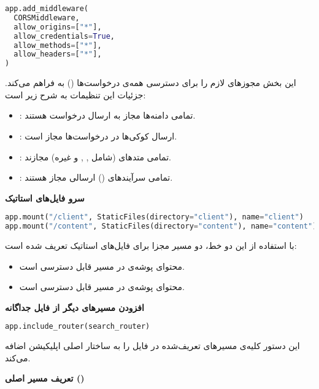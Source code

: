 \documentclass{article}
\begin{document}
\begin{latin}
\begin{lstlisting}[language=Python]
app.add_middleware(
  CORSMiddleware,
  allow_origins=["*"],
  allow_credentials=True,
  allow_methods=["*"],
  allow_headers=["*"],
)
\end{lstlisting}
\end{latin}
این بخش مجوزهای لازم را برای دسترسی همه‌ی درخواست‌ها () به  فراهم می‌کند. جزئیات این تنظیمات به شرح زیر است:
\begin{itemize}
    \item {}: تمامی دامنه‌ها مجاز به ارسال درخواست هستند.
    \item {}: ارسال کوکی‌ها در درخواست‌ها مجاز است.
    \item {}: تمامی متدهای  (شامل , , و غیره) مجازند.
    \item {}: تمامی سرآیندهای () ارسالی مجاز هستند.
\end{itemize}

\textbf{سرو فایل‌های استاتیک}

\begin{latin}
\begin{lstlisting}[language=Python]
app.mount("/client", StaticFiles(directory="client"), name="client")
app.mount("/content", StaticFiles(directory="content"), name="content")
\end{lstlisting}
\end{latin}
با استفاده از این دو خط، دو مسیر مجزا برای فایل‌های استاتیک تعریف شده است:
\begin{itemize}
    \item محتوای پوشه‌ی  در مسیر  قابل دسترسی است.
    \item محتوای پوشه‌ی  در مسیر  قابل دسترسی است.
\end{itemize}

\textbf{افزودن مسیرهای دیگر از فایل جداگانه}

\begin{latin}
\begin{lstlisting}[language=Python]
app.include_router(search_router)
\end{lstlisting}
\end{latin}
این دستور کلیه‌ی مسیرهای تعریف‌شده در فایل  را به ساختار اصلی اپلیکیشن اضافه می‌کند.

\textbf{تعریف مسیر اصلی (\lr{/})}
\end{document}
